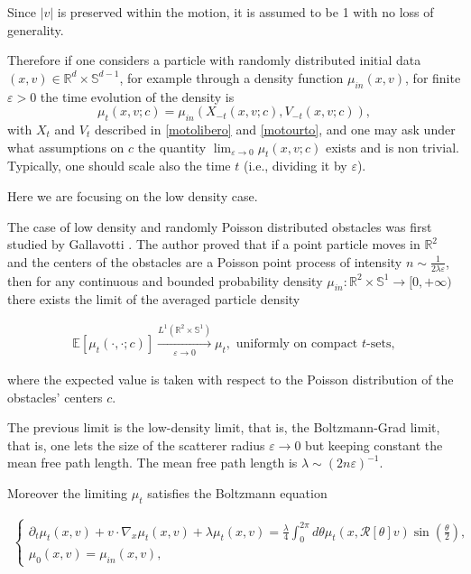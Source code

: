 \documentclass[a4paper,10pt,reqno]{amsart}
\numberwithin{equation}{subsection}
\numberwithin{figure}{subsection}
\begin{document}
Since $|v|$ is preserved within the motion, it is assumed to be 1 with no loss of generality.

Therefore if one considers a particle with randomly distributed initial data $(x,v)\in\mathbb{R}^d\times\mathbb{S}^{d-1}$, for example through a density function $\mu_{in}(x,v)$, for finite $\varepsilon>0$ the time evolution of the density is
\[
\mu_t(x,v;c)=\mu_{in}(X_{-t}(x,v;c),V_{-t}(x,v;c)),
\]
with $X_t$ and $V_t$ described in \eqref{motolibero} and \eqref{motourto}, and one may ask under what assumptions on $c$ the quantity $\lim_{\varepsilon\to0}\mu_t(x,v;c)$ exists and is non trivial. Typically, one should scale also the time $t$ (i.e., dividing it by $\varepsilon$).

Here we are focusing on the low density case.

The case of low density and randomly Poisson distributed obstacles was first studied by Gallavotti \cite{Gallavotti1972}. The author proved that if a point particle moves in $\mathbb{R}^2$ and the centers of the obstacles are a Poisson point process of intensity $n\sim\frac{1}{2\lambda\varepsilon}$, then for any continuous and bounded probability density $\mu_{in}:\mathbb{R}^2\times\mathbb{S}^1\to[0,+\infty)$ there exists the limit of the averaged particle density

\begin{align}\label{thm:G}
\mathbb{E}[\mu_t(\cdot,\cdot;c)]\xrightarrow[\varepsilon\to0]{L^1(\mathbb{R}^2\times\mathbb{S}^1)}\mu_t,\textrm{ uniformly on compact }t\textrm{-sets},
\end{align}

where the expected value is taken with respect to the Poisson distribution of the obstacles' centers $c$. 

The previous limit is the low-density limit, that is, the Boltzmann-Grad limit, that is, one lets the size of the scatterer radius $\varepsilon\to0$ but keeping constant the mean free path length. The mean free path length is $\lambda\sim(2n\varepsilon)^{-1}$.

Moreover the limiting $\mu_t$ satisfies the Boltzmann equation

\begin{align}\label{thm:Gpt2}
\left\{\begin{array}{lcr}\partial_t\mu_t(x,v)+v\cdot\nabla_x\mu_t(x,v)+\lambda\mu_t(x,v)=\frac{\lambda}{4}\int_0^{2\pi}d\theta\mu_t(x,{\mathcal R}[\theta]v)\sin(\frac{\theta}{2}),\\\mu_0(x,v)=\mu_{in}(x,v),\end{array}\right.
\end{align}
\end{document}
